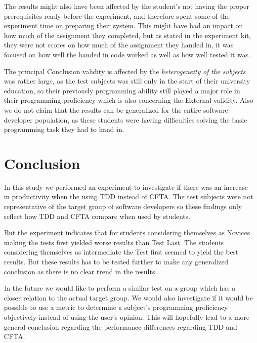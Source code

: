 \documentclass{sig-alternate-05-2015}
\begin{document}
The results might also have been affected by the student's not having the proper prerequisites ready before the experiment, and therefore spent some of the experiment time on preparing their system. This might have had an impact on how much of the assignment they completed, but as stated in the experiment kit, they were not scores on how much of the assignment they handed in, it was focused on how well the handed in code worked as well as how well tested it was.

The principal Conclusion validity is affected by the \textit{heterogeneity of the subjects} was rather large, as the test subjects was still only in the start of their university education, so their previously programming ability still played a major role in their programming proficiency which is also concerning the External validity. Also we do not claim that the results can be generalized for the entire software developer population, as these students were having difficulties solving the basic programming task they had to hand in. 


\section{Conclusion}
In this study we performed an experiment to investigate if there was an increase in productivity when the using TDD instead of CFTA. The test subjects were not representative of the target group of software developers so these findings only reflect how TDD and CFTA compare when used by students. 

But the experiment indicates that for students considering themselves as Novices making the tests first yielded worse results than Test Last. The students considering themselves as intermediate the Test first seemed to yield the best results. But these results has to be tested further to make any generalized conclusion as there is no clear trend in the results.

In the future we would like to perform a similar test on a group which has a closer relation to the actual target group. We would also investigate if it would be possible to use a metric to determine a subject's programming proficiency objectively instead of using the user's opinion. This will hopefully lead to a more general conclusion regarding the performance differences regarding TDD and CFTA.



\end{document}
